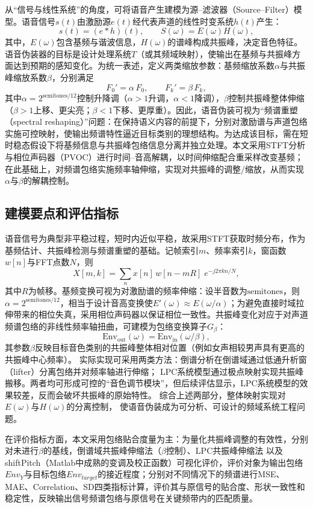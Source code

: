 \documentclass[12pt,a4paper]{article}
\begin{document}
从“信号与线性系统”的角度，可将语音产生建模为源–滤波器（Source–Filter）模型。语音信号$s(t)$由激励源$e(t)$经代表声道的线性时变系统$h(t)$产生：
\[
s(t)=(e*h)(t),\qquad S(\omega)=E(\omega)H(\omega),
\]
其中，$E(\omega)$包含基频与谐波信息，$H(\omega)$的谱峰构成共振峰，决定音色特征。语音伪装器的目标是设计处理系统$T$（或其频域映射），使输出在基频与共振峰方面达到预期的感知变化。为统一表述，定义两类缩放参数：基频缩放系数$\alpha$与共振峰缩放系数$\beta$，分别满足
\[
F_0'=\alpha\,F_0,\qquad F_k'=\beta\,F_k,
\]
其中$\alpha=2^{\mathrm{semitones}/12}$控制升降调（$\alpha>1$升调，$\alpha<1$降调），$\beta$控制共振峰整体伸缩（$\beta>1$上移、更尖亮；$\beta<1$下移、更厚重）。因此，语音伪装可视为“频谱重塑（spectral reshaping）”问题：在保持语义内容的前提下，分别对激励谱与声道包络实施可控映射，使输出频谱特性逼近目标类别的理想结构。为达成该目标，需在短时稳态假设下将基频信息与共振峰包络信息分离并独立处理。本文采用STFT分析与相位声码器（PVOC）进行时间–音高解耦，以时间伸缩配合重采样改变基频；
在此基础上，对频谱包络实施频率轴伸缩，实现对共振峰的调整/缩放，从而实现$\alpha$与$\beta$的解耦控制。

\subsection {建模要点和评估指标}

语音信号为典型非平稳过程，短时内近似平稳，故采用STFT获取时频分布，作为基频估计、共振峰检测与频谱重塑的基础。记帧索引$m$、频率索引$k$，窗函数$w[n]$与FFT点数$N$，则
\[
X[m,k]=\sum_{n}x[n]\,w[n-mR]\;e^{-j2\pi kn/N},
\]
其中$R$为帧移。基频变换可视为对激励谱的频率伸缩：设半音数为$\mathrm{semitones}$，则$\alpha=2^{\mathrm{semitones}/12}$，相当于设计音高变换使$E'(\omega)\approx E(\omega/\alpha)$；为避免直接时域拉伸带来的相位失真，采用相位声码器以保证相位一致性。共振峰变化对应于对声道频谱包络的非线性频率轴扭曲，可建模为包络变换算子$G_\beta$：
\[
\mathrm{Env}_{\mathrm{out}}(\omega)=\mathrm{Env}_{\mathrm{in}}(\omega/\beta),
\]
其参数$\beta$反映目标音色类别的共振峰整体相对位置（例如女声相较男声具有更高的共振峰中心频率）。
实际实现可采用两类方法：倒谱分析在倒谱域通过低通升析窗（lifter）分离包络并对频率轴进行伸缩；
LPC系统模型通过极点映射实现共振峰搬移。两者均可形成可控的“音色调节模块”，但后续评估显示，LPC系统模型的效果较差，反而会破坏共振峰的原始特性。
综合上述两部分，整体映射实现对$E(\omega)$与$H(\omega)$的分离控制，
使语音伪装成为可分析、可设计的频域系统工程问题。


在评价指标方面，本文采用包络贴合度量为主：为量化共振峰调整的有效性，分别对未进行$\beta$的基线，倒谱域共振峰伸缩法（$\beta$控制）、LPC共振峰伸缩法 
以及shiftPitch（Matlab中成熟的变调及校正函数）可视化评价，评价对象为输出包络$Env_Y$与目标包络$Env_{target}$的接近程度；分别对不同情况下的频谱进行MSE、MAE、Correlation、SD四类指标计算，评价其与原信号的贴合度、形状一致性和稳定性，反映输出信号频谱包络与原信号在关键频带内的匹配质量。
\end{document}

